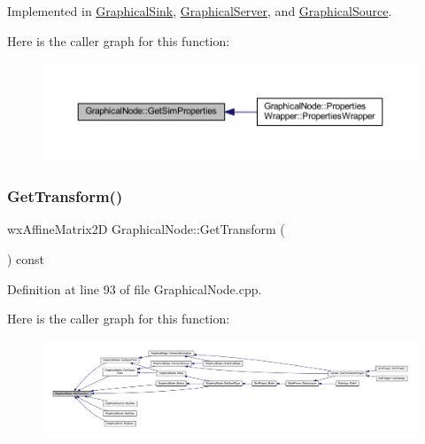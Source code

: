Implemented in \hyperlink{class_graphical_sink_a7e8f63afb0f7ddf14c77cac9e44d30d4}{Graphical\+Sink}, \hyperlink{class_graphical_server_a857655d34a7e3662100e7b86526e2855}{Graphical\+Server}, and \hyperlink{class_graphical_source_a3b7bb7a964e5a5b3a815a005711bb573}{Graphical\+Source}.

Here is the caller graph for this function\+:
\nopagebreak
\begin{figure}[H]
\begin{center}
\leavevmode
\includegraphics[width=350pt]{class_graphical_node_a2ad6386709ceabfbf97daabf4c6cd64a_icgraph}
\end{center}
\end{figure}
\mbox{\label{class_graphical_node_a3556bb1d323f16fd394211cf82239f01}} 
\subsubsection{\texorpdfstring{Get\+Transform()}{GetTransform()}}
{\footnotesize\ttfamily wx\+Affine\+Matrix2D Graphical\+Node\+::\+Get\+Transform (\begin{DoxyParamCaption}{ }\end{DoxyParamCaption}) const}



Definition at line 93 of file Graphical\+Node.\+cpp.

Here is the caller graph for this function\+:
\nopagebreak
\begin{figure}[H]
\begin{center}
\leavevmode
\includegraphics[width=350pt]{class_graphical_node_a3556bb1d323f16fd394211cf82239f01_icgraph}
\end{center}
\end{figure}
\mbox{\label{class_graphical_node_a430fbd68a5d907ed9e73981ab3c499fb}} 
